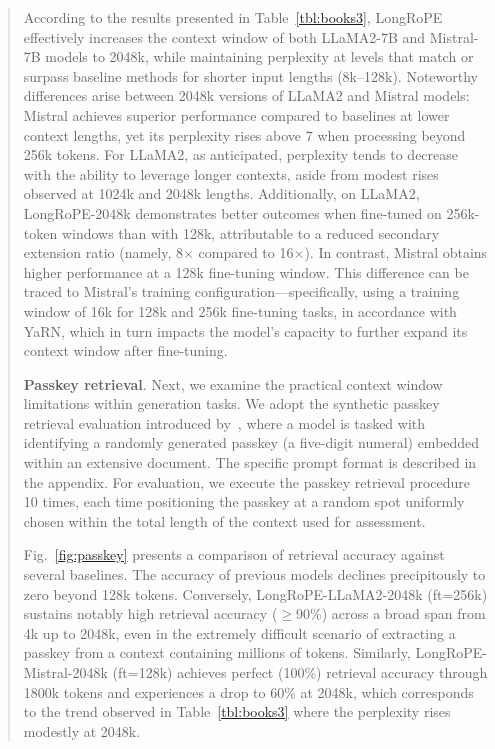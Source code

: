\begin{abstract}
According to the results presented in Table~\ref{tbl:books3}, LongRoPE effectively increases the context window of both LLaMA2-7B and Mistral-7B models to 2048k, while maintaining perplexity at levels that match or surpass baseline methods for shorter input lengths (8k–128k). Noteworthy differences arise between 2048k versions of LLaMA2 and Mistral models: Mistral achieves superior performance compared to baselines at lower context lengths, yet its perplexity rises above 7 when processing beyond 256k tokens. For LLaMA2, as anticipated, perplexity tends to decrease with the ability to leverage longer contexts, aside from modest rises observed at 1024k and 2048k lengths. Additionally, on LLaMA2, LongRoPE-2048k demonstrates better outcomes when fine-tuned on 256k-token windows than with 128k, attributable to a reduced secondary extension ratio (namely, 8$\times$ compared to 16$\times$). In contrast, Mistral obtains higher performance at a 128k fine-tuning window. This difference can be traced to Mistral’s training configuration—specifically, using a training window of 16k for 128k and 256k fine-tuning tasks, in accordance with YaRN, which in turn impacts the model’s capacity to further expand its context window after fine-tuning.

\textbf{Passkey retrieval}. Next, we examine the practical context window limitations within generation tasks. We adopt the synthetic passkey retrieval evaluation introduced by~\cite{passkey}, where a model is tasked with identifying a randomly generated passkey (a five-digit numeral) embedded within an extensive document. The specific prompt format is described in the appendix. For evaluation, we execute the passkey retrieval procedure 10 times, each time positioning the passkey at a random spot uniformly chosen within the total length of the context used for assessment.

Fig.~\ref{fig:passkey} presents a comparison of retrieval accuracy against several baselines. The accuracy of previous models declines precipitously to zero beyond 128k tokens. Conversely, LongRoPE-LLaMA2-2048k (ft=256k) sustains notably high retrieval accuracy ($\ge$90\%) across a broad span from 4k up to 2048k, even in the extremely difficult scenario of extracting a passkey from a context containing millions of tokens. Similarly, LongRoPE-Mistral-2048k (ft=128k) achieves perfect (100\%) retrieval accuracy through 1800k tokens and experiences a drop to 60\% at 2048k, which corresponds to the trend observed in Table~\ref{tbl:books3} where the perplexity rises modestly at 2048k.


\end{abstract}
